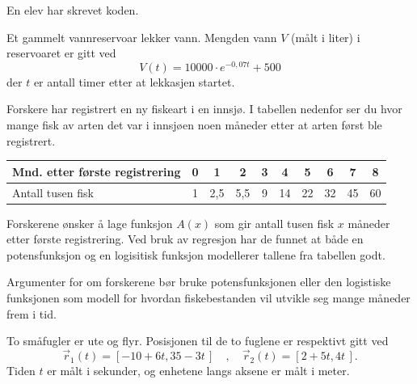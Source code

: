 En elev har skrevet koden.

\newpage
{}
Et gammelt vannreservoar lekker vann. Mengden vann $V$ (målt i liter) i reservoaret er gitt ved
\[
V(t) = 10000 \cdot e^{-0,07t} + 500
\]
der $t$ er antall timer etter at lekkasjen startet.


Forskere har registrert en ny fiskeart i en innsjø. I tabellen nedenfor ser
du hvor mange fisk av arten det var i innsjøen noen måneder etter at arten
først ble registrert.
\begin{center}
	\small
	\begin{tabular}{|l|c|c|c|c|c|c|c|c|c|}
		\hline
		Mnd. etter første registrering & 0 & 1 & 2 & 3 & 4 & 5 & 6 & 7 & 8 \\
		\hline
		Antall tusen fisk & 1 & 2,5 & 5,5 & 9 & 14 & 22 & 32 & 45 & 60 \\
		\hline
	\end{tabular}
\end{center}
Forskerene ønsker å lage funksjon $A(x)$ som gir antall tusen fisk $x$ måneder etter første registrering. Ved bruk av regresjon har de funnet at både en potensfunksjon og en logisitisk funksjon modellerer tallene fra tabellen godt. \os

Argumenter for om forskerene bør bruke potensfunksjonen eller den logistiske funksjonen som modell for hvordan fiskebestanden vil utvikle seg mange måneder frem i tid.

\newpage
{}
To småfugler er ute og flyr. Posisjonen til de to fuglene er respektivt gitt ved
\[
\vec{r}_1(t) = [-10 + 6t, 35 - 3t\,]\quad,
\quad
\vec{r}_2(t) = [2 + 5t, 4t\,].
\]
Tiden $t$ er målt i sekunder, og enhetene langs aksene er målt i meter.


